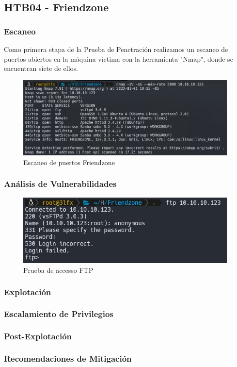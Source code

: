 \subsection{HTB04 - Friendzone}

    \subsubsection{Escaneo}
        \large{Como primera etapa de la Prueba de Penetración realizamos un escaneo de puertos abiertos en la máquina víctima con la herramienta "Nmap", donde se encuentran siete de ellos.}
        \par
        \begin{figure}[h!]
            \centering
            \includegraphics[width=0.99\textwidth]{informe4/imagenes/friendzone/01_escaneo.png}
            \caption{Escaneo de puertos Friendzone} 
        \end{figure}  

    \subsubsection{Análisis de Vulnerabilidades}
    \begin{figure}[h!]
        \centering
        \includegraphics[width=0.99\textwidth]{informe4/imagenes/friendzone/02_ftp.png}
        \caption{Prueba de accesso FTP} 
    \end{figure}
    \subsubsection{Explotación}

    \subsubsection{Escalamiento de Privilegios}

    \subsubsection{Post-Explotación}

    \subsubsection{Recomendaciones de Mitigación}
